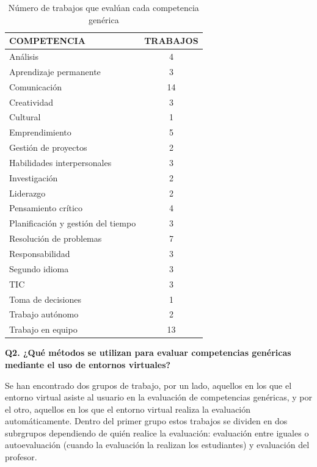 \begin{table}
  \begin{center}
  \begin{tabular}{| m{10cm} | c |}
    \hline
    COMPETENCIA & TRABAJOS\\
    \hline
    \hline
    Análisis & 4\\
    \hline
    Aprendizaje permanente & 3\\
    \hline
    Comunicación & 14\\
    \hline
    Creatividad & 3\\
    \hline
    Cultural & 1\\
    \hline
    Emprendimiento & 5\\
    \hline
    Gestión de proyectos & 2\\
    \hline
    Habilidades interpersonales & 3\\
    \hline
    Investigación & 2\\
    \hline
    Liderazgo & 2\\
    \hline
    Pensamiento crítico & 4\\
    \hline
    Planificación y gestión del tiempo & 3\\
    \hline
    Resolución de problemas & 7\\
    \hline
    Responsabilidad & 3\\
    \hline 
    Segundo idioma & 3\\
    \hline
    TIC & 3\\
    \hline
    Toma de decisiones & 1\\
    \hline
    Trabajo autónomo & 2\\
    \hline
    Trabajo en equipo & 13\\
    \hline
  \end{tabular}
\end{center}
\caption{Número de trabajos que evalúan cada competencia genérica}
\label{tab:TrabajosCompetencia}
\end{table} 

\bigskip
\textbf{Q2. ¿Qué métodos se utilizan para evaluar competencias genéricas mediante el uso de entornos virtuales?}

Se han encontrado dos grupos de trabajo, por un lado, aquellos en los que el entorno virtual asiste al usuario en la evaluación de competencias genéricas, y por el otro, aquellos en los que el entorno virtual realiza la evaluación automáticamente. Dentro del primer grupo estos trabajos se dividen en dos subrgrupos dependiendo de quién realice la evaluación: evaluación entre iguales o autoevaluación (cuando la evaluación la realizan los estudiantes) y evaluación del profesor.

